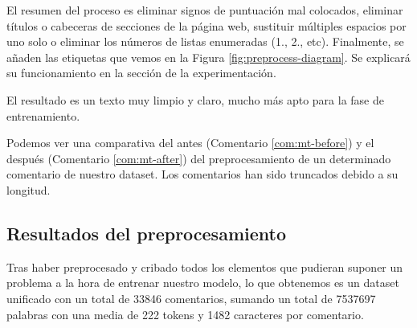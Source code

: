 El resumen del proceso es eliminar signos de puntuación mal colocados, eliminar títulos o cabeceras de secciones de la página web, sustituir múltiples espacios por uno solo o eliminar los números de listas enumeradas (1., 2., etc). Finalmente, se añaden las etiquetas que vemos en la Figura \ref{fig:preprocess-diagram}. Se explicará su funcionamiento en la sección de la experimentación.

El resultado es un texto muy limpio y claro, mucho más apto para la fase de entrenamiento.

Podemos ver una comparativa del antes (Comentario \ref{com:mt-before}) y el después (Comentario \ref{com:mt-after}) del preprocesamiento de un determinado comentario de nuestro dataset. Los comentarios han sido truncados debido a su longitud.


\begin{thm}
	\label{com:mt-before}
\end{thm}


\begin{thm}
	\label{com:mt-after}
\end{thm}

\subsection{Resultados del preprocesamiento}

Tras haber preprocesado y cribado todos los elementos que pudieran suponer un problema a la hora de entrenar nuestro modelo, lo que obtenemos es un dataset unificado con un total de 33846 comentarios, sumando un total de 7537697 palabras con una media de 222 tokens y 1482 caracteres por comentario. 


